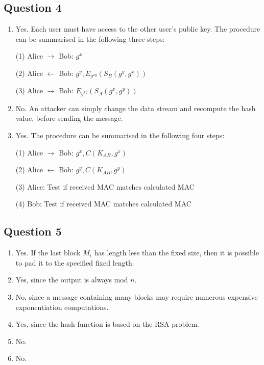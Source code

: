 \documentclass[12pt]{article}
\begin{document}
\subsection*{Question 4}
\begin{enumerate}
\item Yes. Each user must have access to the other user's public key. The procedure can be summarised in the following three steps:
\begin{center}
(1) Alice $\rightarrow$ Bob: $g^{x}$

(2) Alice $\leftarrow$ Bob: $g^{y}, E_{g^{xy}}(S_{B}(g^{y}, g^{x}))$

(3) Alice $\rightarrow$ Bob: $E_{g^{xy}}(S_{A}(g^{x}, g^{y}))$
\end{center}

\item No. An attacker can simply change the data stream and recompute the hash value, before sending the message.

\item Yes. The procedure can be summarised in the following four steps:
\begin{center}
(1) Alice $\rightarrow$ Bob: $g^{x}, C(K_{AB}, g^{x})$

(2) Alice $\leftarrow$ Bob: $g^{y}, C(K_{AB}, g^{y})$

(3) Alice: Test if received MAC matches calculated MAC

(4) Bob: Test if received MAC matches calculated MAC
\end{center}
\end{enumerate}


\subsection*{Question 5}
\begin{enumerate}
\item Yes. If the last block $M_{i}$ has length less than the fixed size, then it is possible to
pad it to the specified fixed length.

\item Yes, since the output is always mod $n$.

\item No, since a message containing many blocks may require numerous expensive exponentiation computations.

\item Yes, since the hash function is based on the RSA problem.

\item No.

\item No.
\end{enumerate}
\end{document}
